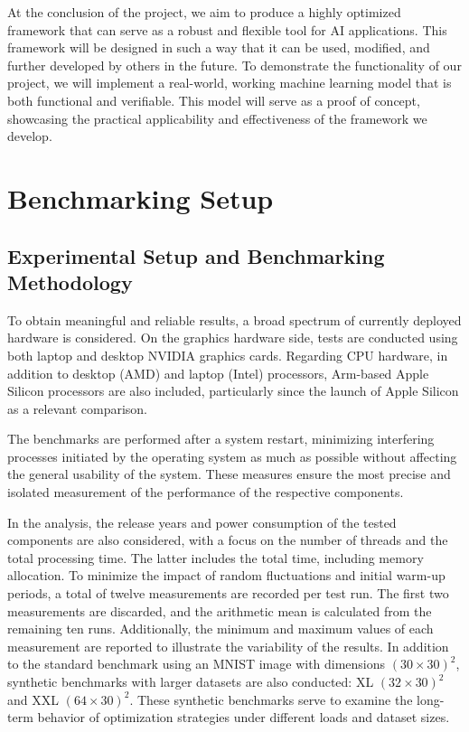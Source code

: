 \documentclass[modern,longauthor]{aastex7}
\begin{document}
At the conclusion of the project, we aim to produce a highly optimized framework that can serve as a robust and flexible tool for AI applications. This framework will be designed in such a way that it can be used, modified, and further developed by others in the future. To demonstrate the functionality of our project, we will implement a real-world, working machine learning model that is both functional and verifiable. This model will serve as a proof of concept, showcasing the practical applicability and effectiveness of the framework we develop.
\section{Benchmarking Setup}\label{sec:benchmarking-setup}
\subsection{Experimental Setup and Benchmarking Methodology}
To obtain meaningful and reliable results, a broad spectrum of currently deployed hardware is considered. On the graphics hardware side, tests are conducted using both laptop and desktop NVIDIA graphics cards. Regarding CPU hardware, in addition to desktop (AMD) and laptop (Intel) processors, Arm-based Apple Silicon processors are also included, particularly since the launch of Apple Silicon as a relevant comparison.

The benchmarks are performed after a system restart, minimizing interfering processes initiated by the operating system as much as possible without affecting the general usability of the system. These measures ensure the most precise and isolated measurement of the performance of the respective components.

In the analysis, the release years and power consumption of the tested components are also considered, with a focus on the number of threads and the total processing time. The latter includes the total time, including memory allocation. To minimize the impact of random fluctuations and initial warm-up periods, a total of twelve measurements are recorded per test run. The first two measurements are discarded, and the arithmetic mean is calculated from the remaining ten runs. Additionally, the minimum and maximum values of each measurement are reported to illustrate the variability of the results.
In addition to the standard benchmark using an MNIST image with dimensions $(30 \times 30)^2$, synthetic benchmarks with larger datasets are also conducted: XL $(32 \times 30)^2$ and XXL $(64 \times 30)^2$. These synthetic benchmarks serve to examine the long-term behavior of optimization strategies under different loads and dataset sizes.
\end{document}

